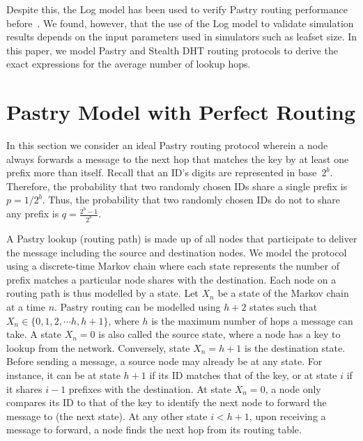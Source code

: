 \documentclass[10pt,twocolumn]{article}
\begin{document}

Despite this, the Log model has been used to verify Pastry routing
performance before~\cite{Rowstron01Pastry, Brampton06Stealth}. We
found, however, that the use of the Log model to validate simulation
results depends on the input parameters used in simulators such as
leafset size. In this paper, we model Pastry and Stealth DHT routing
protocols to derive the exact expressions for the average number of
lookup hops.



\section{Pastry Model with Perfect Routing }
\label{mod.pastry}

In this section we consider an ideal Pastry routing protocol wherein a node
always forwards a message to the next hop that matches the key by at least one
prefix more than itself. Recall that an ID's digits are represented in
base~$2^b$. Therefore, the probability that  two randomly chosen IDs share a
single prefix is $p = 1/2^b$. Thus, the probability that two randomly chosen
IDs do not to share any prefix is $q = \frac{2^b - 1}{2^b}$.

A Pastry lookup (routing path) is made up of all nodes that participate to
deliver the message including the source and destination nodes. We model the
protocol using a discrete-time Markov chain where each state represents the number
of prefix matches a particular node shares with the destination. Each node on a
routing path is thus modelled by a state. Let $X_n$ be a state of the Markov
chain at a time $n$.  Pastry routing can be modelled using $h+2$ states such
that $X_n \in \{0,1,2, \cdots h, h+1\}$, where $h$ is the maximum number of
hops a message can take. A state $X_n = 0$ is also called the source state,
where a node has a key to lookup from the network. Conversely, state $X_n =
h+1$ is the destination state. Before sending a message, a source node may
already be at any state. For instance, it can be at state $h+1$ if its ID
matches that of the key, or at state $i$ if it shares $i-1$ prefixes with the
destination. At state $X_n=0$, a node only compares its ID to that of the key
to identify  the next node to forward the message to (the next state). At any
other state $i < h+1$, upon receiving a message to forward, a node finds the
next hop from its routing table.
\end{document}
